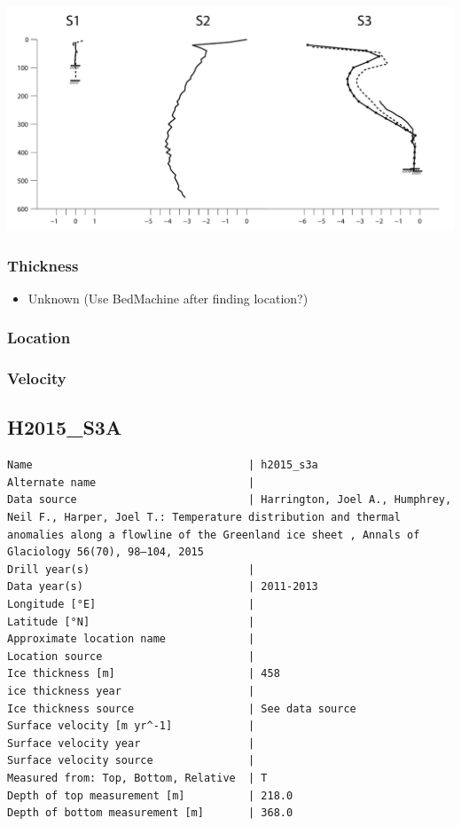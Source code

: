 \documentclass[article,a4paper,times,11pt,twoside]{article}
\begin{document}
\begin{center}
\includegraphics[width=.9\linewidth]{h2015_s2a/harrington_2015_fig2_S1_S2_S3.png}
\end{center}

\subsubsection{Thickness}
\label{sec:org580aa8c}

\begin{itemize}
\item Unknown (Use BedMachine after finding location?)
\end{itemize}

\subsubsection{Location}
\label{sec:org25624ce}

\subsubsection{Velocity}
\label{sec:org6140b24}
\clearpage
\subsection{H2015\_S3A}
\label{sec:org5a0ddc4}
\begin{verbatim}
Name                                  | h2015_s3a
Alternate name                        | 
Data source                           | Harrington, Joel A., Humphrey, Neil F., Harper, Joel T.: Temperature distribution and thermal anomalies along a flowline of the Greenland ice sheet , Annals of Glaciology 56(70), 98–104, 2015 
Drill year(s)                         | 
Data year(s)                          | 2011-2013
Longitude [°E]                        | 
Latitude [°N]                         | 
Approximate location name             | 
Location source                       | 
Ice thickness [m]                     | 458
ice thickness year                    | 
Ice thickness source                  | See data source
Surface velocity [m yr^-1]            | 
Surface velocity year                 | 
Surface velocity source               | 
Measured from: Top, Bottom, Relative  | T
Depth of top measurement [m]          | 218.0
Depth of bottom measurement [m]       | 368.0
\end{verbatim}
\end{document}
